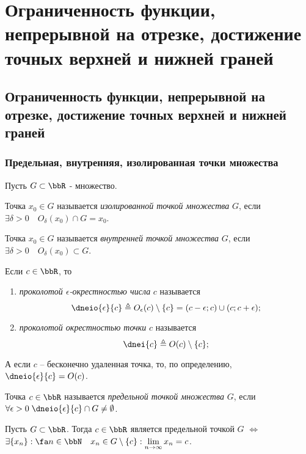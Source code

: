 \chapter{Ограниченность функции, непрерывной на отрезке, достижение точных верхней и нижней граней}

\section{Ограниченность функции, непрерывной на отрезке, достижение точных верхней и нижней граней}

\subsection{Предельная, внутренняя, изолированная точки множества}
Пусть $G \subset \bbR$ - множество.
\begin{defn}
Точка $x_0 \in G$ называется \textit{изолированной точкой множества} $G$, если $\exists \delta >0\quad  O_\delta(x_0) \cap G = x_0$.
\end{defn}

\begin{defn}
Точка $x_0 \in G$ называется \textit{внутренней точкой множества} $G$, если $\exists \delta >0\quad O_\delta(x_0) \subset G$.
\end{defn}

\begin{defn}
Если $c \in \bbR$, то 
\begin{enumerate}
\item
\textit{проколотой $\epsilon$-окрестностью числа} $c$ называется $$\dneio{\epsilon}{c} \triangleq O_\epsilon(c)\setminus\{c\}=(c-\epsilon;c)\cup(c;c+\epsilon);$$
\item
\textit{проколотой окрестностью точки} $c$ называется $$\dnei{c} \triangleq O(c)\setminus \{c\};$$
\end{enumerate}
\textbullet\; А если $c$ -- бесконечно удаленная точка, то, по определению, $\dneio{\epsilon}{c}= O (c) $.
\end{defn}

\begin{defn}
Точка $c \in \bbR$ называется \textit{предельной точкой множества} $G$, если $\forall \epsilon >0 \;\dneio{\epsilon}{c} \cap G \ne \emptyset$.
\end{defn}

\begin{thm}
\label{exp13}
Пусть $G \subset \bbR$. Тогда $c \in \bbR$ является предельной точкой $G$ $\Longleftrightarrow$ $ \exists \{x_n\}: \fa n \in \bbN \quad x_n \in G\setminus\{c\}: \lim_{n \to \infty}\limits x_n = c$. 
\end{thm}
